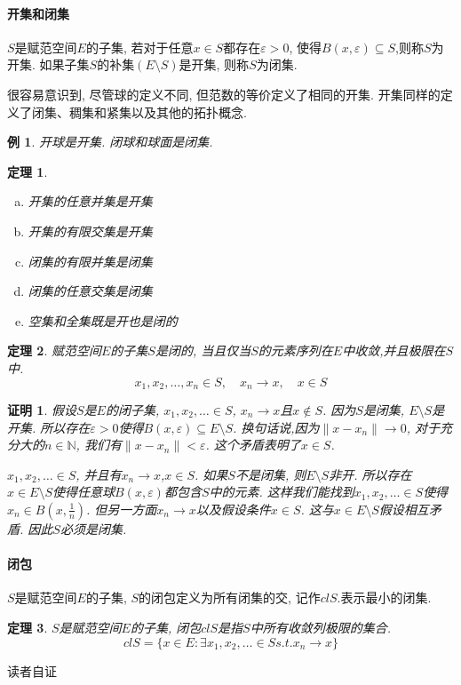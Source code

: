 \documentclass[a4paper,11pt]{article}
\theoremstyle{mystyle}
\newtheorem{theorem}{\hspace{2em}定理}[section]
\newtheorem{Proof}{\hspace{2em}证明}[section]
\newtheorem{example}{\hspace{2em}例}[section]
\begin{document}
\paragraph*{开集和闭集}
\begin{definition}
  $S$是赋范空间$E$的子集, 若对于任意$x\in S$都存在$\varepsilon>0$, 使得$B(x,\varepsilon)\subseteq S$,则称$S$为开集. 如果子集$S$的补集$(E\setminus S)$是开集, 则称$S$为闭集.
\end{definition}
很容易意识到, 尽管球的定义不同, 但范数的等价定义了相同的开集. 开集同样的定义了闭集、稠集和紧集以及其他的拓扑概念.
\begin{example}
  开球是开集. 闭球和球面是闭集.
\end{example}
\begin{theorem}\quad
\begin{enumerate}[(a)]
  \item 开集的任意并集是开集
  \item 开集的有限交集是开集
  \item 闭集的有限并集是闭集
  \item 闭集的任意交集是闭集
  \item 空集和全集既是开也是闭的
\end{enumerate}
\end{theorem}
\begin{theorem}
  赋范空间$E$的子集$S$是闭的, 当且仅当$S$的元素序列在$E$中收敛,并且极限在$S$中.
  \begin{equation*}
    x_1,x_2,\dots,x_n\in S,\quad x_n\to x,\quad x\in S
  \end{equation*}
\end{theorem}
\begin{Proof}
  假设$S$是$E$的闭子集, $x_1,x_2,\dots\in S$, $x_n\to x$且$x\notin S$. 因为$S$是闭集, $E\setminus S$是开集. 所以存在$\varepsilon>0$使得$B(x,\varepsilon)\subseteq E\setminus S$. 换句话说,因为$\|x-x_n\|\to 0$, 对于充分大的$n\in \mathbb{N}$, 我们有$\|x-x_n\|<\varepsilon$. 这个矛盾表明了$x\in S$.

  $x_1,x_2,\dots\in S$, 并且有$x_n\to x$,$x\in S$. 如果$S$不是闭集, 则$E\setminus S$非开. 所以存在$x\in E\setminus S$使得任意球$B(x,\varepsilon)$都包含$S$中的元素. 这样我们能找到$x_1,x_2,\dots\in S$使得$x_n\in B(x,\frac{1}{n})$. 但另一方面$x_n\to x$以及假设条件$x\in S$. 这与$x\in E\setminus S$假设相互矛盾. 因此$S$必须是闭集.
\end{Proof}
\paragraph*{闭包}
\begin{definition}
  $S$是赋范空间$E$的子集, $S$的闭包定义为所有闭集的交, 记作$cl S$.表示最小的闭集.
\end{definition}
\begin{theorem}
  $S$是赋范空间$E$的子集, 闭包$cl S$是指$S$中所有收敛列极限的集合.
  \begin{equation*}
    cl S=\{x\in E:\exists x_1,x_2,\dots\in S s.t. x_n\to x\}
  \end{equation*}
\end{theorem}
读者自证
\end{document}
